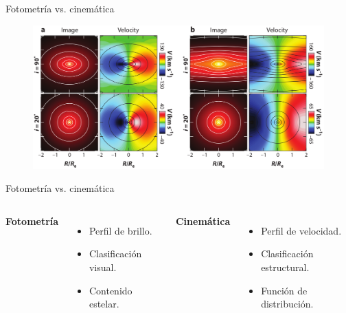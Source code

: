 \documentclass[xcolor=dvipsnames,4pt]{beamer}
\newenvironment{changemargin}[2]{%
  \begin{list}{}{%
    \setlength{\topsep}{0pt}%
    \setlength{\leftmargin}{#1}%
    \setlength{\rightmargin}{#2}%
    \setlength{\listparindent}{\parindent}%
    \setlength{\itemindent}{\parindent}%
    \setlength{\parsep}{\parskip}%
  }%
\item[]}{\end{list}}
\begin{document}
\begin{frame}{Fotometría vs. cinemática}
\begin{figure}
\includegraphics[scale=0.74]{img/isof_cin.png}
\end{figure}
\end{frame}

\begin{frame}{Fotometría vs. cinemática}
\begin{changemargin}{-1cm}{-1cm}
\begin{columns}
{\bf Fotometría}
\bigskip
\bigskip
\bigskip
\begin{itemize}
\item Perfil de brillo.
\item Clasificación visual.
\item Contenido estelar.
\end{itemize}
{\bf Cinemática}
\bigskip
\bigskip
\bigskip
\begin{itemize}
\item Perfil de velocidad.
\item Clasificación estructural.
\item Función de distribución.
\end{itemize}
\end{columns}
\end{changemargin}
\end{frame}
\end{document}
